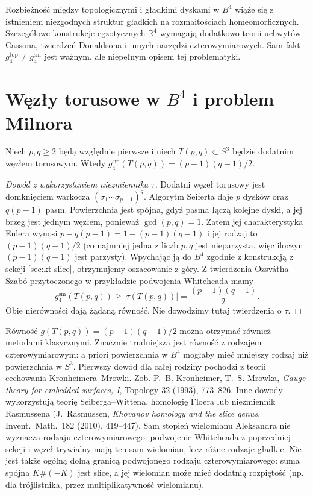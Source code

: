 \begin{uwaga}
Rozbieżność między topologicznymi i gładkimi dyskami
w $B^4$ wiąże się z istnieniem niezgodnych struktur
gładkich na rozmaitościach homeomorficznych.
Szczegółowe konstrukcje egzotycznych $\mathbb R^4$
wymagają dodatkowo teorii uchwytów Cassona, twierdzeń
Donaldsona i innych narzędzi czterowymiarowych.
Sam fakt $g_4^{\mathrm{top}}\ne g_4^{\mathrm{sm}}$
jest ważnym, ale niepełnym opisem tej problematyki.
\end{uwaga}

\section{Węzły torusowe w \texorpdfstring{$B^4$}{B4} i problem Milnora}
\label{sec:kt-milnor}

\begin{twierdzenie}
\label{thm:kt-milnor-genus}
Niech $p,q\geq2$ będą względnie pierwsze i niech
$T(p,q)\subset S^3$ będzie dodatnim węzłem torusowym.
Wtedy
$g_4^{\mathrm{sm}}(T(p,q))=(p-1)(q-1)/2$.
\end{twierdzenie}

\begin{proof}[Dowód z wykorzystaniem niezmiennika $\tau$]
Dodatni węzeł torusowy jest domknięciem warkocza
$(\sigma_1\cdots\sigma_{p-1})^q$.
Algorytm Seiferta daje $p$ dysków oraz
$q(p-1)$ pasm. Powierzchnia jest spójna,
gdyż pasma łączą kolejne dyski, a jej brzeg
jest jednym węzłem, ponieważ $\gcd(p,q)=1$.
Zatem jej charakterystyka Eulera wynosi
$p-q(p-1)=1-(p-1)(q-1)$ i jej rodzaj
to $(p-1)(q-1)/2$ (co najmniej jedna z liczb
$p,q$ jest nieparzysta, więc iloczyn
$(p-1)(q-1)$ jest parzysty).
Wpychając ją do $B^4$ zgodnie z konstrukcją
z sekcji \ref{sec:kt-slice}, otrzymujemy
oszacowanie z góry. Z twierdzenia
Ozsvátha--Szabó przytoczonego w przykładzie
podwojenia Whiteheada mamy
\[
g_4^{\mathrm{sm}}(T(p,q))
\ge |\tau(T(p,q))|
=\frac{(p-1)(q-1)}2.
\]
Obie nierówności dają żądaną równość.
Nie dowodzimy tutaj twierdzenia o $\tau$.
\end{proof}

\begin{uwaga}
Równość $g(T(p,q))=(p-1)(q-1)/2$ można
otrzymać również metodami klasycznymi. Znacznie trudniejsza
jest równość z rodzajem czterowymiarowym: a priori
powierzchnia w $B^4$ mogłaby mieć mniejszy rodzaj niż
powierzchnia w $S^3$. Pierwszy dowód dla całej rodziny
pochodzi z teorii cechowania Kronheimera--Mrowki.
Zob. P.~B. Kronheimer, T.~S. Mrowka,
\emph{Gauge theory for embedded surfaces, I},
Topology 32 (1993), 773--826.
Inne dowody wykorzystują teorię Seiberga--Wittena,
homologię Floera lub niezmiennik Rasmussena
(J.~Rasmussen, \emph{Khovanov homology and the
slice genus}, Invent.~Math.~182 (2010), 419--447).
Sam stopień wielomianu Aleksandra nie wyznacza
rodzaju czterowymiarowego: podwojenie Whiteheada
z poprzedniej sekcji i węzeł trywialny mają ten
sam wielomian, lecz różne rodzaje gładkie.
Nie jest także ogólną dolną granicą podwojonego
rodzaju czterowymiarowego: suma spójna
$K\#(-K)$ jest slice, a jej wielomian może
mieć dodatnią rozpiętość (np. dla trójlistnika,
przez multiplikatywność wielomianu).
\end{uwaga}

